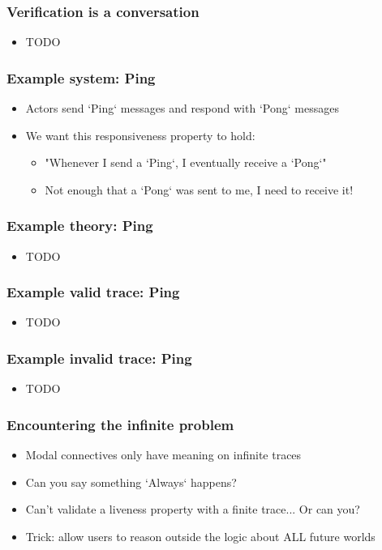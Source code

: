 \documentclass{beamer}
\begin{document}
\begin{frame}
\frametitle{Verification is a conversation}
\begin{itemize}
  \item TODO
\end{itemize}
\end{frame}

\begin{frame}
\frametitle{Example system: Ping}
\begin{itemize}
  \item Actors send `Ping` messages and respond with `Pong` messages
  \item We want this responsiveness property to hold:
  \begin{itemize}
    \item "Whenever I send a `Ping`, I eventually receive a `Pong`"
    \item Not enough that a `Pong` was sent to me, I need to receive it!
  \end{itemize}
\end{itemize}
\end{frame}

\begin{frame}
\frametitle{Example theory: Ping}
\begin{itemize}
  \item TODO
\end{itemize}
\end{frame}

\begin{frame}
\frametitle{Example valid trace: Ping}
\begin{itemize}
  \item TODO
\end{itemize}
\end{frame}

\begin{frame}
\frametitle{Example invalid trace: Ping}
\begin{itemize}
  \item TODO
\end{itemize}
\end{frame}

\begin{frame}
\frametitle{Encountering the infinite problem}
\begin{itemize}
  \item Modal connectives only have meaning on infinite traces
  \item Can you say something `Always` happens?
  \item Can't validate a liveness property with a finite trace... Or can you?
  \item Trick: allow users to reason outside the logic about ALL future worlds
\end{itemize}
\end{frame}
\end{document}
